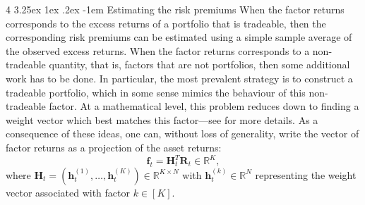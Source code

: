 \documentclass[12pt]{article}
\makeatletter
\renewcommand\paragraph{%
	\@startsection{paragraph}
	{4}
	{\z@}
	{3.25ex \@plus1ex \@minus.2ex}
	{-1em}
	{\normalfont\normalsize\bfseries\maybe@addperiod}%
}
\newcommand{\maybe@addperiod}[1]{%
	#1\@addpunct{.}%
}
\makeatother
\begin{document}
\paragraph{Estimating the risk premiums} When the factor returns corresponds to the excess returns of a portfolio that is tradeable, then the corresponding risk premiums can be estimated using a simple sample average of the observed excess returns. When the factor returns corresponds to a non-tradeable quantity, that is, factors that are not portfolios, then some additional work has to be done. In particular, the most prevalent strategy is to construct a tradeable portfolio, which in some sense mimics the behaviour of this non-tradeable factor. At a mathematical level, this problem reduces down to finding a weight vector which best matches this factor---see \citet[Section 3.3]{giglio2022arfe} for more details. As a consequence of these ideas, one can, without loss of generality, write the vector of factor returns as a projection of the asset returns: 
\begin{equation}
	\mathbf{f}_t = \mathbf{H}_t^T \mathbf{R}_t \in \mathbb{R}^K,
\end{equation}
where $\mathbf{H}_t = (\mathbf{h}_t^{(1)}, \dots, \mathbf{h}_t^{(K)}) \in \mathbb{R}^{K \times N}$ with $\mathbf{h}_t^{(k)} \in \mathbb{R}^N$ representing the weight vector associated with factor $k \in [K]$. 
\end{document}
